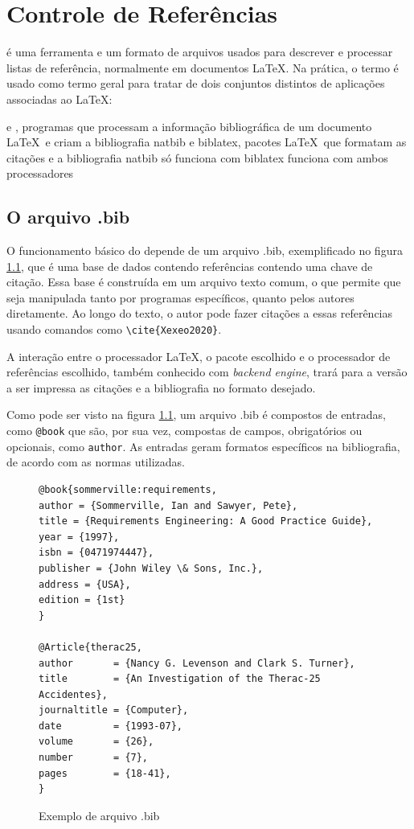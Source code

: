 \chapter{Controle de Referências}

 é uma ferramenta e um formato de arquivos usados para descrever e processar listas de referência,       normalmente em documentos \LaTeX  . Na prática, o termo  é usado como termo geral para tratar de dois conjuntos distintos de aplicações associadas ao \LaTeX:
\begin{outline}
    \1  e , programas que
    processam a informação bibliográfica de um documento \LaTeX\ e criam a bibliografia
    \1 natbib e biblatex, pacotes \LaTeX\ que formatam as citações e a bibliografia
    \2 natbib só funciona com 
    \2 biblatex funciona com ambos processadores
\end{outline}


\section{O arquivo .bib}

O funcionamento básico do   depende de um arquivo .bib, exemplificado no figura \ref{fig:bibfile}, que é uma base de dados contendo  referências contendo uma chave de citação. Essa base é construída em um arquivo texto comum, o que permite que seja manipulada tanto por programas específicos, quanto pelos autores diretamente. Ao longo do texto, o autor pode fazer citações a essas referências usando comandos como \lstinline|\cite{Xexeo2020}|. 

A interação entre o processador \LaTeX, o pacote escolhido e o processador de referências escolhido, também conhecido com \textit{backend engine}, trará para a versão a ser impressa as citações e a bibliografia no formato desejado. 

Como pode ser visto na figura \ref{fig:bibfile}, um arquivo .bib é compostos de entradas, como \lstinline|@book| que são, por sua vez, compostas de campos, obrigatórios ou opcionais, como \lstinline|author|. As entradas geram formatos específicos na bibliografia, de acordo com as normas utilizadas.

\begin{figure}
\centering
\begin{verbatim}
@book{sommerville:requirements,
author = {Sommerville, Ian and Sawyer, Pete},
title = {Requirements Engineering: A Good Practice Guide},
year = {1997},
isbn = {0471974447},
publisher = {John Wiley \& Sons, Inc.},
address = {USA},
edition = {1st}
}

@Article{therac25,
author       = {Nancy G. Levenson and Clark S. Turner},
title        = {An Investigation of the Therac-25 Accidentes},
journaltitle = {Computer},
date         = {1993-07},
volume       = {26},
number       = {7},
pages        = {18-41},
}
\end{verbatim}
\caption{Exemplo de arquivo .bib}
\label{fig:bibfile}
\end{figure}

